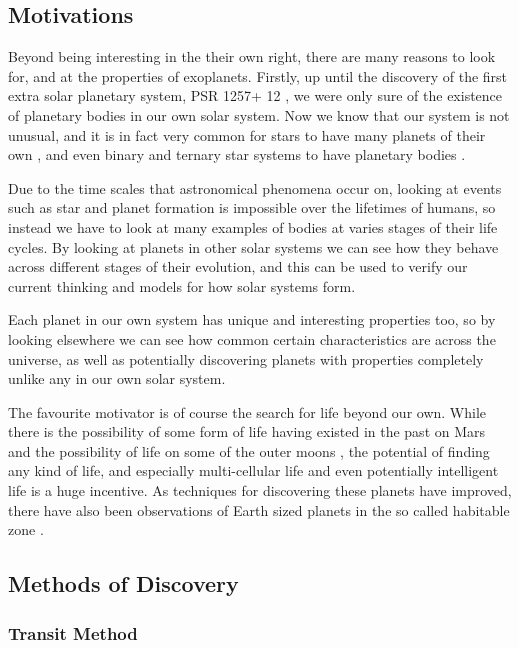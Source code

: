 \subsection{Motivations}

Beyond being interesting in the their own right, there are many reasons to look for, and at the properties of exoplanets. Firstly, up until the discovery of the first extra solar planetary system, PSR 1257+ 12 \cite{wolszczan1992planetary}, we were only sure of the existence of planetary bodies in our own solar system. Now we know that our system is not unusual, and it is in fact very common for stars to have many planets of their own \cite{mcarthur2004detection}, and even binary and ternary star systems to have planetary bodies \cite{marcy2002planet}.

Due to the time scales that astronomical phenomena occur on, looking at events such as star and planet formation is impossible over the lifetimes of humans, so instead we have to look at many examples of bodies at varies stages of their life cycles. By looking at planets in other solar systems we can see how they behave across different stages of their evolution, and this can be used to verify our current thinking and models for how solar systems form.

Each planet in our own system has unique and interesting properties too, so by looking elsewhere we can see how common certain characteristics are across the universe, as well as potentially discovering planets with properties completely unlike any in our own solar system.

The favourite motivator is of course the search for life beyond our own. While there is the possibility of some form of life having existed in the past on Mars \cite{mckay1996search} and the possibility of life on some of the outer moons \cite{mckay2005possibilities}, the potential of finding any kind of life, and especially multi-cellular life and even potentially intelligent life is a huge incentive. As techniques for discovering these planets have improved, there have also been observations of Earth sized planets in the so called habitable zone \cite{wordsworth2011gliese}.

\subsection{Methods of Discovery}

\subsubsection{Transit Method}

